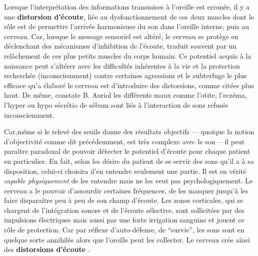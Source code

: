 Lorsque l'interprétation des informations transmises à l'oreille est
erronée, il y a une 
\textbf{distorsion d'écoute}, liée au dysfonctionnement
de ces deux muscles dont le rôle est de permettre l'arrivée
harmonieuse du son dans l'oreille interne, puis au cerveau. Car, lorsque
le message sensoriel est altéré, le cerveau se protège en déclenchant
des mécanismes d'inhibition de l'écoute, traduit souvent par un relâchement de
ces plus petits muscles du corps humain. Ce potentiel acquis à
la naissance peut s'altérer avec les difficultés inhérentes à
la vie et la protection recherchée (inconsciemment) contre certaines agressions et le subterfuge le plus
efficace qu'a élaboré le cerveau est
d'introduire des distorsions, comme citées plus haut. De même, constate B. Auriol
les différents maux comme l'otite, l'eczéma, l'hyper
ou hypo sécrétio de sébum sont liés à l'interaction de sons refusés
inconsciemment.  \autocite  [19--20] {auriol:cle}




Car,même si le relevé des seuils donne des résultats objectifs
--- quoique la notion d'objectivité comme dit précédemment, est très complexe
avec le son ---il peut paraître paradoxal de pouvoir détecter 
le potentiel d'écoute pour
chaque patient en particulier.
En fait, selon les désirs du patient de se servir des sons
qu'il a à sa disposition, celui-ci choisira d'en entendre seulement une
partie. Il est en vérité \textit{capable physiquement} de les entendre
mais ne les veut pas psychologiquement. Le cerveau a le
  pouvoir d'assourdir certaines fréquences, de les masquer jusqu'à les faire disparaître peu à peu de
  son champ d'écoute. Les zones corticales, qui se chargent de
  l'intégration sonore et de l'écoute sélective, sont sollicitées par des impulsions électriques mais aussi par une forte irrigation
  sanguine et
  jouent ce rôle de protection.
\autocite [14]  {auriol:cle}  Car par réflexe d'auto-défense, de ``survie'', les sons
  sont en quelque sorte
  annihilés alors que  l'oreille peut les collecter. Le
  cerveau crée ainsi des\textbf{ distorsions
  d'écoute} \autocite{tomatis:education}.

  



  




 




  

